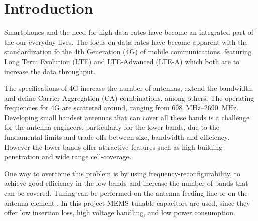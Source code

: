 \chapter{Introduction}
\label{cha:intro}
Smartphones and the need for high data rates have become an integrated part of the our everyday lives. The focus on data rates have become apparent with the standardization fo the 4th Generation (4G) of mobile communications, featuring Long Term Evolution (LTE) and LTE-Advanced (LTE-A) which both are to increase the data throughput. 

The specifications of 4G increase the number of antennas, extend the bandwidth and define Carrier Aggregation (CA) combinations, among others. The operating frequencies for 4G are scattered around, ranging from \SIrange{698}{2690}{MHz}. Developing small handset antennas that can cover all these bands is a challenge for the antenna engineers, particularly for the lower bands, due to the fundamental limits and trade-offs between size, bandwidth and efficiency\cite{}. However the lower bands offer attractive features such as high building penetration and wide range cell-coverage. 

One way to overcome this problem is by using frequency-reconfigurability, to achieve good efficiency in the low bands and increase the number of bands that can be covered. Tuning can be performed on the antenna feeding line \cite{} \cite{} or on the antenna element \cite{} \cite{}. In this project MEMS tunable capacitors are used, since they offer low insertion loss, high voltage handling, and low power consumption\cite{}.
